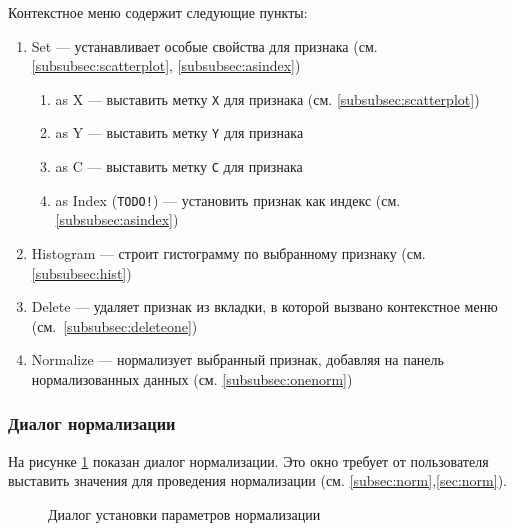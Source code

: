 \documentclass[12pt,tikz]{instruction}
\begin{document}
Контекстное меню содержит следующие пункты:
\begin{enumerate}
	\item Set --- устанавливает особые свойства для признака (см. \ref{subsubsec:scatterplot}, \ref{subsubsec:asindex})
	\begin{enumerate}
		\item as X --- выставить метку \texttt{X} для признака (см. \ref{subsubsec:scatterplot})
		\item as Y --- выставить метку \texttt{Y} для признака
		\item as C --- выставить метку \texttt{C} для признака
		\item as Index (\texttt{TODO!}) --- установить признак как индекс (см. \ref{subsubsec:asindex})
	\end{enumerate}
	\item Histogram --- строит гистограмму по выбранному признаку (см. \ref{subsubsec:hist})
	\item Delete --- удаляет признак из вкладки, в которой вызвано контекстное меню (\mbox{см. \ref{subsubsec:deleteone}})
	\item Normalize --- нормализует выбранный признак, добавляя на панель нормализованных данных (см. \ref{subsubsec:onenorm})

	
\end{enumerate}

\newpage
\subsubsection{Диалог нормализации}

На рисунке \ref{fig:normdialog} показан диалог нормализации. Это окно требует от пользователя выставить значения для проведения нормализации (см. \ref{subsec:norm},\ref{sec:norm}). 
\begin{figure}[H]
	\centering
	\caption{Диалог установки параметров нормализации}
	\label{fig:normdialog}
\end{figure}
\end{document}
